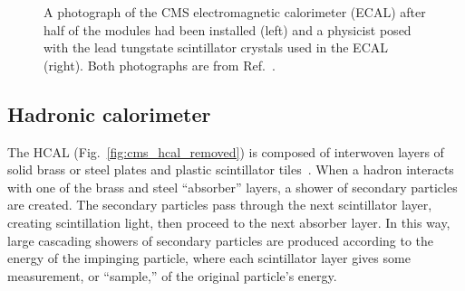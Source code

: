 \begin{figure}[htb]
    \centering
    \quad
    \caption[A photograph of the CMS electromagnetic calorimeter (ECAL) after half of the modules had been installed and a physicist posed with the lead tungstate scintillator crystals used in the ECAL]{
        A photograph of the CMS electromagnetic calorimeter (ECAL) after half of the modules had been installed (left) and a physicist posed with the lead tungstate scintillator crystals used in the ECAL (right). 
        Both photographs are from Ref.~\cite{Brice:1431477}.
    }
    \label{fig:cms_ecal}
\end{figure}

\subsection{Hadronic calorimeter}
The HCAL (Fig.~\ref{fig:cms_hcal_removed}) is composed of interwoven layers of solid brass or steel plates and plastic scintillator tiles~\cite{CERN-LHCC-97-031}. 
When a hadron interacts with one of the brass and steel ``absorber'' layers, a shower of secondary particles are created. %
The secondary particles pass through the next scintillator layer, creating scintillation light, then proceed to the next absorber layer. 
In this way, large cascading showers of secondary particles are produced according to the energy of the impinging particle, where each scintillator layer gives some measurement, or ``sample,'' of the original particle's energy. 


